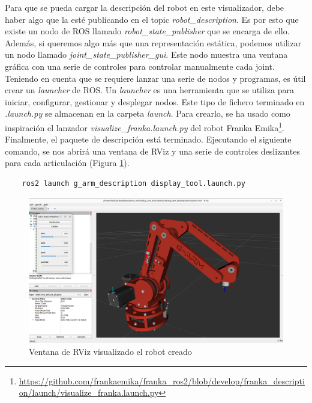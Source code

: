 Para que se pueda cargar la descripción del robot en este visualizador, debe haber algo que la esté publicando en el topic 
\textit{robot\_description}. Es por esto que existe un nodo de ROS llamado \textit{robot\_state\_publisher} que se encarga 
de ello. Además, si queremos algo más que una representación estática, podemos utilizar un nodo llamado \mbox{\textit{joint\_state\_publisher\_gui}}. Este nodo 
muestra una ventana gráfica con una serie de controles para controlar manualmente cada joint. 
\\

Teniendo en cuenta que se requiere lanzar una serie de nodos y programas, es útil crear un \textit{launcher} de ROS. Un \textit{launcher} es una 
herramienta que se utiliza para iniciar, configurar, gestionar y desplegar nodos. Este tipo de fichero terminado en 
\textit{.launch.py} se almacenan en la carpeta \textit{launch}. Para crearlo, se ha usado como inspiración el lanzador \textit{visualize\_franka.launch.py} del 
robot Franka Emika\footnote{\url{https://github.com/frankaemika/franka_ros2/blob/develop/franka_description/launch/visualize_franka.launch.py}}.
\\

Finalmente, el paquete de descripción está terminado. Ejecutando el siguiente comando, se nos abrirá una ventana de RViz y una 
serie de controles deslizantes para cada articulación (Figura \ref{fig:rviz}).
\begin{verbatim}
    ros2 launch g_arm_description display_tool.launch.py
\end{verbatim}

\begin{figure} [ht!]
    \begin{center}
        \includegraphics[width=15cm]{figs/RViz.png}
    \end{center}
    \caption{Ventana de RViz visualizado el robot creado}
\label{fig:rviz}
\end{figure}

